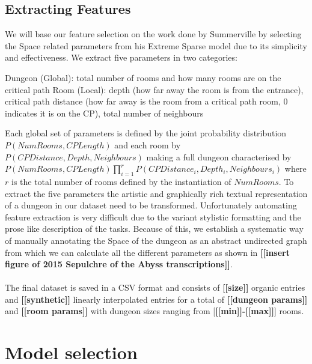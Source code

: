 \documentclass{UoYCSproject}
\begin{document}
\subsection{Extracting Features}
We will base our feature selection on the work done by Summerville \parencite{SummervilleSamplingHyrule} by selecting the Space related parameters from his Extreme Sparse model due to its simplicity and effectiveness. We extract five parameters in two categories: 
\begin{outline}[enumerate]
  \1 Dungeon (Global): total number of rooms and how many rooms are on the critical path
  \2 Room (Local): depth (how far away the room is from the entrance), critical path distance (how far away is the room from a critical path room, 0 indicates it is on the CP), total number of neighbours
\end{outline}
Each global set of parameters is defined by the joint probability distribution \(P(NumRooms, CPLength)\) and each room by \(P(CPDistance, Depth, Neighbours)\) making a full dungeon characterised by \(P(NumRooms, CPLength) \prod_{i=1}^{r} P(CPDistance_i, Depth_i, Neighbours_i)\) where \(r\) is the total number of rooms defined by the instantiation of \(NumRooms\). To extract the five parameters the artistic and graphically rich textual representation of a dungeon in our dataset need to be transformed. Unfortunately automating feature extraction is very difficult due to the variant stylistic formatting and the prose like description of the tasks. Because of this, we establish a systematic way of manually annotating the Space of the dungeon as an abstract undirected graph from which we can calculate all the different parameters as shown in \textbf{[[insert figure of 2015 Sepulchre of the Abyss transcriptions]]}.


\paragraph{}
The final dataset is saved in a CSV format and consists of \textbf{[[size]]} organic entries and \textbf{[[synthetic]]} linearly interpolated entries for a total of \textbf{[[dungeon params]]} and \textbf{[[room params]]} with dungeon sizes ranging from [\textbf{[[min]]-[[max]]}] rooms. %

\section{Model selection} %
\label{sec:model_selection}
\end{document}
